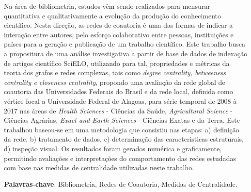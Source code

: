 \documentclass[tcc]{ic}
\begin{document}

\capa


\begin{resumo}
\noindent 

Na área de bibliometria, estudos vêm sendo realizados para mensurar quantitativa e qualitativamente a evolução da produção do conhecimento científico. Nesta direção, as redes de coautoria é uma das formas de indicar a interação entre autores, pelo esforço colaborativo entre pessoas, instituições e países para a geração e publicação de um trabalho científico. Este trabalho busca a propositura de uma análise investigativa a partir de base de dados de indexação de artigos científico SciELO, utilizando para tal, propriedades e métricas da teoria dos grafos e redes complexas, tais como \textit{degree centrality, betweeness centrality e closeness centrality}, propondo uma avaliação da rede global de coautoria das Universidades Federais do Brasil e da rede local, definida como vértice focal a Universidade Federal de Alagoas, para série temporal de 2008 à 2017 nas áreas de \textit{Health Sciences} - Ciências da Saúde, \textit{Agricultural Science} - Ciências Agrárias, \textit{Exact and Earth Sciences} - Ciências Exatas e da Terra. Este trabalhou baseou-se em uma metodologia que consistiu nas etapas: a) definição da rede, b) tratamento de dados, c) determinação das características estruturais, d) inspeção visual. Os resultados foram gerados numérica e graficamente, permitindo avaliações e interpretações do comportamento das redes estudadas com base nas medidas de centralidade utilizadas neste trabalho.

\vspace{1em}

\noindent
{\bf Palavras-chave}: Bibliometria, Redes de Coautoria, Medidas de Centralidade.
\end{resumo}
\end{document}
